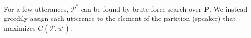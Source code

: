 For a few utterances, $\mathcal{P}^*$ can be found by brute force search over $\mathbf{P}$. We instead greedily assign each utterance to the element of the partition (speaker) that maximizes $G\left(\mathcal{P}, u^i\right)$.















